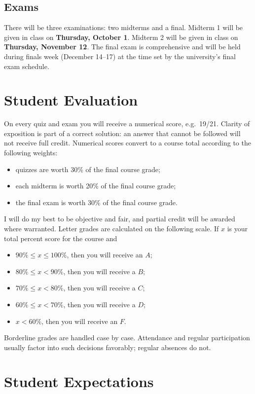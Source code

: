 \documentclass[11pt]{amsart}
\begin{document}
\begin{raggedright}
\subsection{Exams}

There will be three examinations: two midterms and a final.
Midterm 1 will be given in class on \textbf{Thursday, October 1}.  Midterm 2 will be
given in class on \textbf{Thursday, November 12}.  The final exam is comprehensive and
will be held during finals week (December 14--17) at the time set by the university's
final exam schedule.

\section{Student Evaluation}

On every quiz and exam you will receive a numerical score,
e.g.\ 19/21.  Clarity of exposition is part of a correct solution: an answer that
cannot be followed will not receive full credit.  Numerical scores convert to a course
total according to the following weights:
\begin{itemize}
\item quizzes are worth 30\% of the final course grade;
\item each midterm is worth 20\% of the final course grade;
\item the final exam is worth 30\% of the final course grade.
\end{itemize}
I will do my best to be objective and fair, and partial credit will be awarded where
warranted.  Letter grades are calculated on the following scale.  If $x$ is your total
percent score for the course and
\begin{itemize}
\item $90\%\leq x \leq 100\%$, then you will receive an $A$;
\item $80\%\leq x < 90\%$, then you will receive a $B$;
\item $70\% \leq x < 80\%$, then you will receive a $C$;
\item $60\% \leq x < 70\%$, then you will receive a $D$;
\item $x < 60\%$, then you will receive an $F$.
\end{itemize}
Borderline grades are handled case by case.  Attendance and regular participation
usually factor into such decisions favorably; regular absences do not.

\section{Student Expectations}


\end{raggedright}
\end{document}
